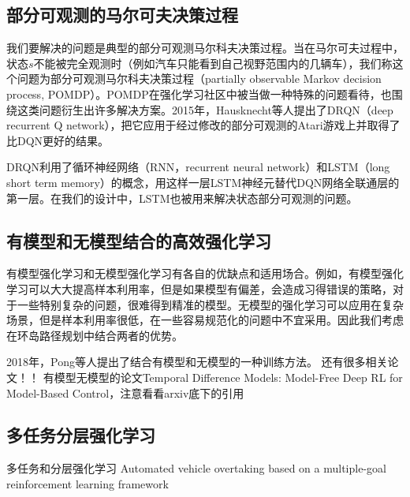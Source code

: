 \documentclass[degree=bachelor, tocarialchapter, pifootnote]{thuthesis}
\begin{document}
  \subsection{部分可观测的马尔可夫决策过程}
    我们要解决的问题是典型的部分可观测马尔科夫决策过程。当在马尔可夫过程中，状态$s$不能被完全观测时（例如汽车只能看到自己视野范围内的几辆车），我们称这个问题为部分可观测马尔科夫决策过程（partially observable Markov decision process, POMDP）。POMDP在强化学习社区中被当做一种特殊的问题看待，也围绕这类问题衍生出许多解决方案。2015年，Hausknecht等人提出了DRQN\cite{DRQ}（deep recurrent Q network），把它应用于经过修改的部分可观测的Atari游戏上并取得了比DQN更好的结果。\par
    DRQN利用了循环神经网络（RNN，recurrent neural network）和LSTM\cite{LSTM}（long short term memory）的概念，用这样一层LSTM神经元替代DQN网络全联通层的第一层。在我们的设计中，LSTM也被用来解决状态部分可观测的问题。
  
  \subsection{有模型和无模型结合的高效强化学习}
    有模型强化学习和无模型强化学习有各自的优缺点和适用场合。例如，有模型强化学习可以大大提高样本利用率，但是如果模型有偏差，会造成习得错误的策略，对于一些特别复杂的问题，很难得到精准的模型。无模型的强化学习可以应用在复杂场景，但是样本利用率很低，在一些容易规范化的问题中不宜采用。因此我们考虑在环岛路径规划中结合两者的优势。\par
    2018年，Pong等人提出了结合有模型和无模型的一种训练方法\cite{TDM}。
    还有很多相关论文！！
    有模型无模型的论文Temporal Difference Models: Model-Free Deep RL for Model-Based Control，注意看看arxiv底下的引用
  
  \subsection{多任务分层强化学习}
    多任务和分层强化学习
    Automated vehicle overtaking based on a multiple-goal reinforcement learning framework
  
\end{document}

